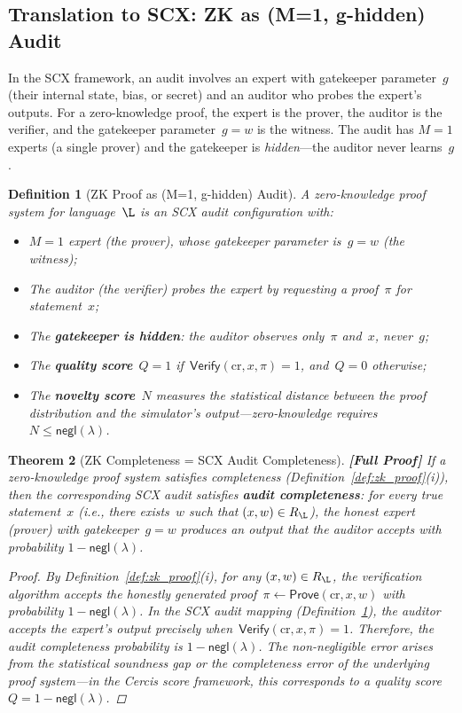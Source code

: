 \documentclass[12pt,a4paper]{article}
\newtheorem{theorem}{Theorem}[section]
\newtheorem{definition}[theorem]{Definition}
\theoremstyle{remark}
\newcommand{\SCX}{\textsf{SCX}}
\newcommand{\Cercis}{\textsf{Cercis}}
\newcommand{\Verify}{\textsf{Verify}}
\newcommand{\Prove}{\textsf{Prove}}
\newcommand{\negl}{\textsf{negl}}
\newcommand{\rigorFull}{\textbf{[Full Proof]}}
\begin{document}
\subsection{Translation to SCX: ZK as (M=1, g-hidden) Audit}

In the \SCX{} framework, an audit involves an expert with gatekeeper parameter~$g$ (their internal state, bias, or secret) and an auditor who probes the expert's outputs. For a zero-knowledge proof, the expert is the prover, the auditor is the verifier, and the gatekeeper parameter~$g = w$ is the witness. The audit has $M = 1$ experts (a single prover) and the gatekeeper is \emph{hidden}---the auditor never learns~$g$.

\begin{definition}[ZK Proof as (M=1, g-hidden) Audit]
\label{def:zk_audit}
A zero-knowledge proof system for language~$\L$ is an \SCX{} audit configuration with:
\begin{itemize}[leftmargin=*]
  \item $M = 1$ expert (the prover), whose gatekeeper parameter is~$g = w$ (the witness);
  \item The auditor (the verifier) probes the expert by requesting a proof~$\pi$ for statement~$x$;
  \item The \textbf{gatekeeper is hidden}: the auditor observes only~$\pi$ and~$x$, never~$g$;
  \item The \textbf{quality score}~$Q = 1$ if~$\Verify(\text{cr}, x, \pi) = 1$, and~$Q = 0$ otherwise;
  \item The \textbf{novelty score}~$N$ measures the statistical distance between the proof distribution and the simulator's output---zero-knowledge requires~$N \leq \negl(\lambda)$.
\end{itemize}
\end{definition}

\begin{theorem}[ZK Completeness = SCX Audit Completeness]
\label{thm:zk_completeness}
\rigorFull
If a zero-knowledge proof system satisfies completeness (Definition~\ref{def:zk_proof}(i)), then the corresponding \SCX{} audit satisfies \textbf{audit completeness}: for every true statement~$x$ (i.e., there exists~$w$ such that $(x, w) \in R_{\L}$), the honest expert (prover) with gatekeeper~$g = w$ produces an output that the auditor accepts with probability $1 - \negl(\lambda)$.

\begin{proof}
By Definition~\ref{def:zk_proof}(i), for any $(x, w) \in R_{\L}$, the verification algorithm accepts the honestly generated proof~$\pi \leftarrow \Prove(\text{cr}, x, w)$ with probability $1 - \negl(\lambda)$. In the \SCX{} audit mapping (Definition~\ref{def:zk_audit}), the auditor accepts the expert's output precisely when~$\Verify(\text{cr}, x, \pi) = 1$. Therefore, the audit completeness probability is $1 - \negl(\lambda)$. The non-negligible error arises from the statistical soundness gap or the completeness error of the underlying proof system---in the \Cercis{} score framework, this corresponds to a quality score~$Q = 1 - \negl(\lambda)$.
\end{proof}
\end{theorem}
\end{document}
